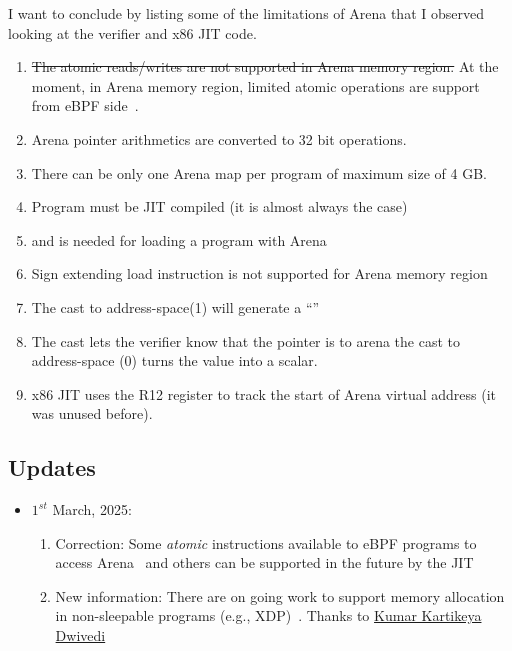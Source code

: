 \documentclass{article} \usepackage{graphicx}
\begin{document}
I want to conclude by listing some of the limitations of Arena that I observed
looking at the verifier and x86 JIT code.

\begin{enumerate}
  \item \sout{The atomic reads/writes are not supported in Arena memory region.} At the moment, in Arena memory region, limited atomic operations are support from eBPF side~\cite{arena_atomic}.
\item Arena pointer arithmetics are converted to 32 bit operations.
\item There can be only one Arena map per program of maximum size of 4 GB.
\item Program must be JIT compiled (it is almost always the case)
\item {} and  is needed for loading a program with Arena
\item Sign extending load instruction is not supported for Arena memory region
\item The cast to address-space(1) will generate a ``''
\item The cast lets the verifier know that the pointer is to arena
        the cast to address-space (0) turns the value into a scalar.
\item x86 JIT uses the R12 register to track the start of Arena virtual
    address (it was unused before).
\end{enumerate}

\subsection{Updates}
\begin{itemize}
  \item $1^{st}$ March, 2025:
    \begin{enumerate}
      \item Correction: Some \emph{atomic} instructions available to eBPF programs to access Arena~\cite{arena_atomic} and others can be supported in the future by the JIT
      \item New information: There are on going work to support memory allocation in non-sleepable programs (e.g., XDP)~\cite{slub,try_alloc}. Thanks to \href{https://kkdwivedi.in/}{Kumar Kartikeya Dwivedi}
    \end{enumerate}
\end{itemize}



\end{document}
